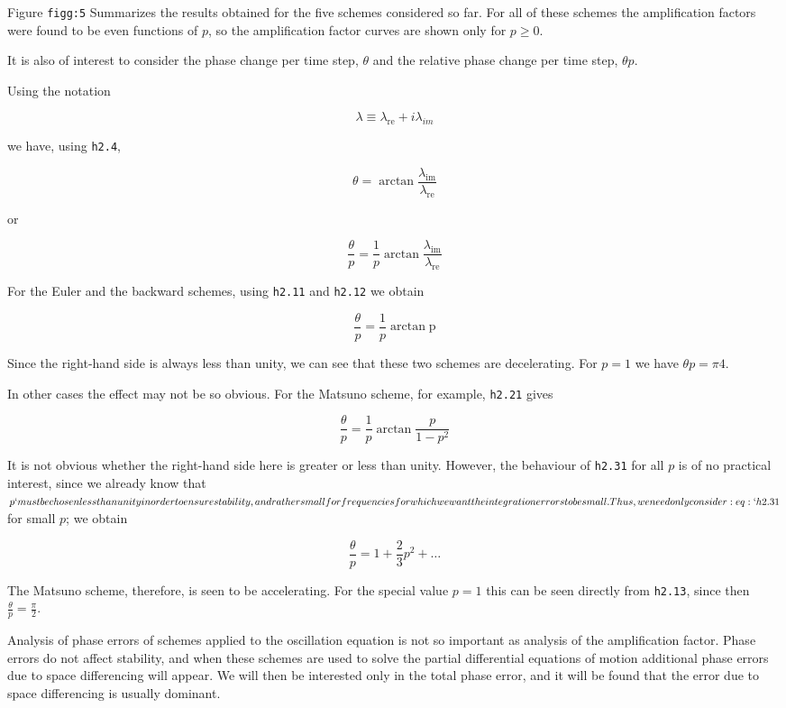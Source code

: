 Figure \texttt{figg:5} Summarizes the results obtained for the five
schemes considered so far. For all of these schemes the amplification
factors were found to be even functions of \(p\), so the amplification
factor curves are shown only for \(p \geq 0\).

It is also of interest to consider the phase change per time step,
\(\theta\) and the relative phase change per time step, \(\theta p\).

Using the notation

{\[\lambda \equiv \lambda_{\text{re}} + i\lambda_{im}\]}

we have, using \texttt{h2.4},

{\[\theta = \arctan\frac{\lambda_{\text{im}}}{\lambda_{\text{re}}}\]}

or

{\[\frac{\theta}{p} = \frac{1}{p}\arctan\frac{\lambda_{\text{im}}}{\lambda_{\text{re}}}\]}

For the Euler and the backward schemes, using \texttt{h2.11} and
\texttt{h2.12} we obtain

{\[\frac{\theta}{p} = \frac{1}{p}\arctan\text{p}\]}

Since the right-hand side is always less than unity, we can see that
these two schemes are decelerating. For \(p = 1\) we have
\(\theta p = \pi 4\).

In other cases the effect may not be so obvious. For the Matsuno scheme,
for example, \texttt{h2.21} gives

{\[\frac{\theta}{p} = \frac{1}{p}\arctan\frac{p}{1 - p^{2}}\]}

It is not obvious whether the right-hand side here is greater or less
than unity. However, the behaviour of \texttt{h2.31} for all \(p\) is of
no practical interest, since we already know that \(p`must be chosen
less than unity in order to ensure stability, and rather small for
frequencies for which we want the integration errors to be small. Thus,
we need only consider :eq:`h2.31\) for small \(p\); we obtain

\[\frac{\theta}{p} = 1 + \frac{2}{3}p^{2} + \ldots\]

The Matsuno scheme, therefore, is seen to be accelerating. For the
special value \(p = 1\) this can be seen directly from \texttt{h2.13},
since then \(\frac{\theta}{p} = \frac{\pi}{2}\).

Analysis of phase errors of schemes applied to the oscillation equation
is not so important as analysis of the amplification factor. Phase
errors do not affect stability, and when these schemes are used to solve
the partial differential equations of motion additional phase errors due
to space differencing will appear. We will then be interested only in
the total phase error, and it will be found that the error due to space
differencing is usually dominant.

